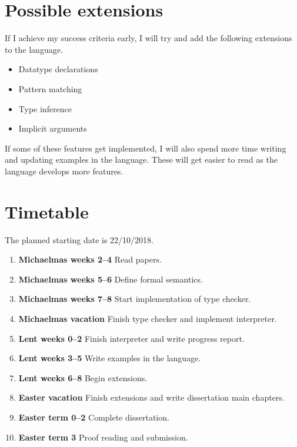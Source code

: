 \documentclass[12pt,a4paper,twoside]{article}
\begin{document}
\section*{Possible extensions}

If I achieve my success criteria early, I will try and add the following extensions to the language.

\begin{itemize}
	\item Datatype declarations
	\item Pattern matching
	\item Type inference
	\item Implicit arguments
\end{itemize}

If some of these features get implemented, I will also spend more time writing and updating examples in the language.
These will get easier to read as the language develops more features.


\section*{Timetable}

The planned starting date is 22/10/2018.

\begin{enumerate}

\item \textbf{Michaelmas weeks 2--4} Read papers.

\item \textbf{Michaelmas weeks 5--6} Define formal semantics.

\item \textbf{Michaelmas weeks 7--8} Start implementation of type checker.

\item \textbf{Michaelmas vacation} Finish type checker and implement interpreter.

\item \textbf{Lent weeks 0--2} Finish interpreter and write progress report.

\item \textbf{Lent weeks 3--5} Write examples in the language.

\item \textbf{Lent weeks 6--8} Begin extensions.

\item \textbf{Easter vacation} Finish extensions and write dissertation main chapters.

\item \textbf{Easter term 0--2}  Complete dissertation.

\item \textbf{Easter term 3} Proof reading and submission.

\end{enumerate}
\end{document}
